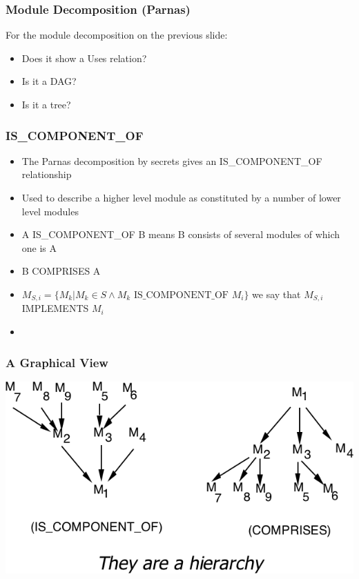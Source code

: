 \documentclass[t,12pt,numbers,fleqn]{beamer}
\begin{document}

\begin{frame}
\frametitle{Module Decomposition (Parnas)}

For the module decomposition on the previous slide:

\begin{itemize}
\item Does it show a Uses relation?  
\item Is it a DAG?  
\item Is it a tree?
\end{itemize}

\end{frame}


\begin{frame}
\frametitle{IS\_COMPONENT\_OF}

\begin{itemize}
\item The Parnas decomposition by secrets gives an IS\_COMPONENT\_OF relationship
\item Used to describe a higher level module as constituted by a number of lower level modules
\item A IS\_COMPONENT\_OF B means B consists of several modules of which one is A
\item B COMPRISES A
\item $M_{S,i} = \{ M_k | M_k \in S \wedge M_k \mbox{ IS\_COMPONENT\_OF } M_i \}$ we say that $M_{S,i}$ IMPLEMENTS
$M_i$ 
\item {}
\end{itemize}

\end{frame}


\begin{frame}
\frametitle{A Graphical View}

\begin{center}
\includegraphics[width=1.0\textwidth]{../Figures/GraphViewOf_IS_COMPONENT_OF.png}
\end{center}

\end{frame}
\end{document}
